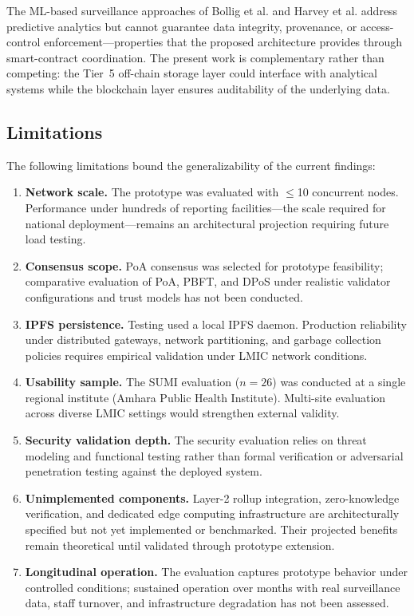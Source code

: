 \documentclass[AMA,LATO1COL]{WileyNJD-v2}
\begin{document}
The ML-based surveillance approaches of Bollig et al.\cite{bollig2020machine} and Harvey et al.\cite{harvey2021predicting} address predictive analytics but cannot guarantee data integrity, provenance, or access-control enforcement---properties that the proposed architecture provides through smart-contract coordination. The present work is complementary rather than competing: the Tier~5 off-chain storage layer could interface with analytical systems while the blockchain layer ensures auditability of the underlying data.

\subsection{Limitations}\label{subsec:limitations}

The following limitations bound the generalizability of the current findings:

\begin{enumerate}
\item \textbf{Network scale.} The prototype was evaluated with $\leq$10 concurrent nodes. Performance under hundreds of reporting facilities---the scale required for national deployment---remains an architectural projection requiring future load testing.

\item \textbf{Consensus scope.} PoA consensus was selected for prototype feasibility; comparative evaluation of PoA, PBFT, and DPoS under realistic validator configurations and trust models has not been conducted.

\item \textbf{IPFS persistence.} Testing used a local IPFS daemon. Production reliability under distributed gateways, network partitioning, and garbage collection policies requires empirical validation under LMIC network conditions.

\item \textbf{Usability sample.} The SUMI evaluation ($n=26$) was conducted at a single regional institute (Amhara Public Health Institute). Multi-site evaluation across diverse LMIC settings would strengthen external validity.

\item \textbf{Security validation depth.} The security evaluation relies on threat modeling and functional testing rather than formal verification or adversarial penetration testing against the deployed system.

\item \textbf{Unimplemented components.} Layer-2 rollup integration, zero-knowledge verification, and dedicated edge computing infrastructure are architecturally specified but not yet implemented or benchmarked. Their projected benefits remain theoretical until validated through prototype extension.

\item \textbf{Longitudinal operation.} The evaluation captures prototype behavior under controlled conditions; sustained operation over months with real surveillance data, staff turnover, and infrastructure degradation has not been assessed.
\end{enumerate}
\end{document}
